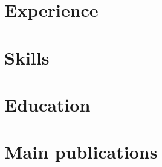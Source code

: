 \documentclass[letter,10pt]{article}
\begin{document}
\section{Experience}


\section{Skills}

\section{Education}


\section{Main publications}

\end{document}
